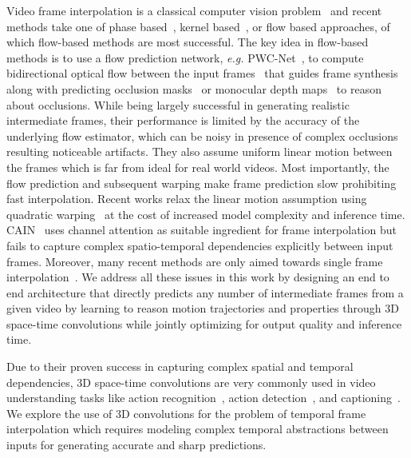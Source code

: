 \documentclass[10pt,twocolumn,letterpaper]{article}
\begin{document}
 Video frame interpolation is a classical computer vision problem~\cite{mahajan2009moving}
and recent methods take one of phase based~\cite{meyer2015phase, meyer2018phasenet}, kernel based~\cite{niklaus2017video, niklaus2017video_2, peleg2019net,  cheng2020video, liu2017video, shi2020video}, or flow based approaches, of which flow-based methods\cite{jiang2018super, bao2019depth, xu2019quadratic, xue2019video, chi2020all, liu2019deep, bao2019memc, yuan2019zoom, niklaus2018context, yu2013multi, zhang2019flexible, niklaus2020softmax, huang2020rife, siyao2021deep} are most successful. The key idea in flow-based methods is to 
use a flow prediction network, \emph{e.g.} PWC-Net~\cite{sun2018pwc}, to compute bidirectional optical flow between the input frames~\cite{jiang2018super} that guides frame synthesis along with predicting occlusion masks~\cite{jiang2018super, bao2019memc, xue2019video} or monocular depth maps~\cite{bao2019depth} to reason about occlusions.
While being largely successful in generating realistic intermediate frames, 
their performance is limited by the accuracy of the underlying flow estimator, which can be noisy in presence of complex occlusions resulting noticeable artifacts. They also assume uniform linear motion between the frames which is far from ideal for real world videos. Most importantly, the flow prediction and subsequent warping make frame prediction slow prohibiting fast interpolation. Recent works relax the linear motion assumption using quadratic warping~\cite{xu2019quadratic, liu2020enhanced} at the cost of increased model complexity and inference time.
CAIN~\cite{choi2020channel} uses channel attention as suitable ingredient for frame interpolation but fails to capture complex spatio-temporal dependencies explicitly between input frames. Moreover, many recent methods are only aimed towards single frame interpolation~\cite{huang2020rife, tulyakov2021time, siyao2021deep}. We address all these issues in this work by designing an end to end architecture that directly predicts any number of intermediate frames from a given video by learning to reason motion trajectories and properties through 3D space-time convolutions while jointly optimizing for output quality and inference time.




 Due to their proven success in capturing complex spatial and temporal dependencies, 3D space-time convolutions are very commonly used in video understanding tasks like action recognition~\cite{tran2015learning, tran2018closer, xie2018rethinking, carreira2017quo, feichtenhofer2019slowfast}, action detection~\cite{cdc,Xu2017iccv}, and captioning~\cite{xu2016msr-vtt}. We explore the use of 3D convolutions for the problem of temporal frame interpolation which requires modeling complex temporal abstractions between inputs for generating accurate and sharp predictions.
\end{document}
